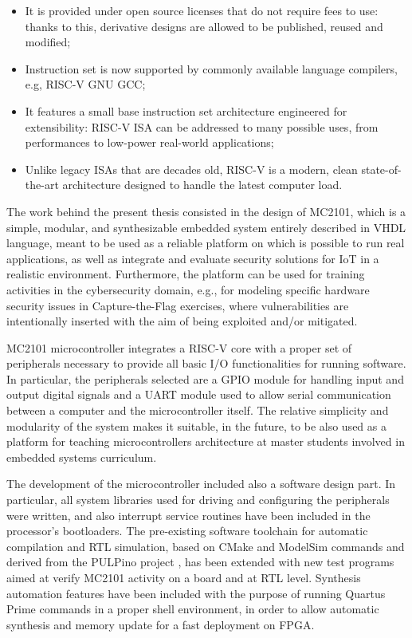 \begin{itemize}
\item It is provided under open source licenses that do not require fees to use: thanks to this, derivative designs are allowed to be published, reused and modified;
\item Instruction set is now supported by commonly available language compilers, e.g, RISC-V GNU GCC;
\item It features a small base instruction set architecture engineered for extensibility: RISC-V ISA can be addressed to many possible uses, from performances to low-power real-world applications;
\item Unlike legacy ISAs that are decades old, RISC-V is a modern, clean state-of-the-art architecture designed to handle the latest computer load.
\end{itemize}

The work behind the present thesis consisted in the design of MC2101, which is a simple, modular, and synthesizable embedded system entirely described in VHDL language, meant to be used as a reliable platform on which is possible to run real applications, as well as integrate and evaluate security solutions for IoT in a realistic environment. Furthermore, the platform can be used for training activities in the cybersecurity domain, e.g., for modeling specific hardware security issues in Capture-the-Flag exercises, where vulnerabilities are intentionally inserted with the aim of being exploited and/or mitigated.

MC2101 microcontroller integrates a RISC-V core with a proper set of peripherals necessary to provide all basic I/O functionalities for running software. In particular, the peripherals selected are a GPIO module for handling input and output digital signals and a UART module used to allow serial communication between a computer and the microcontroller itself. The relative simplicity and modularity of the system makes it suitable, in the future, to be also used as a platform for teaching microcontrollers architecture at master students involved in embedded systems curriculum.

The development of the microcontroller included also a software design part. In particular, all system libraries used for driving and configuring the peripherals were written, and also interrupt service routines have been included in the processor's bootloaders. The pre-existing software toolchain for automatic compilation and RTL simulation, based on CMake and ModelSim commands and derived from the PULPino project \cite{pulpino}, has been extended with new test programs aimed at verify MC2101 activity on a board and at RTL level. Synthesis automation features have been included with the purpose of running Quartus Prime commands in a proper shell environment, in order to allow automatic synthesis and memory update for a fast deployment on FPGA.


